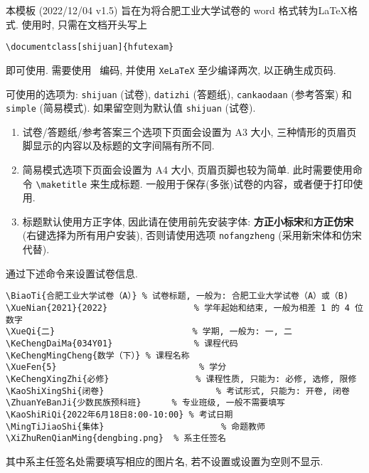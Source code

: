 \documentclass{hfutexam}
\begin{document}
\XiZhuRenQianMing{}



\indent
本模板 (2022/12/04 v1.5) 旨在为将合肥工业大学试卷的 word 格式转为\LaTeX{}格式.
使用时, 只需在文档开头写上
\begin{lstlisting}
\documentclass[shijuan]{hfutexam}
\end{lstlisting}
即可使用.
需要使用~{\color{blue}{\lstinline|UTF-8|}} 编码, 并使用 \lstinline|XeLaTeX| 至少编译两次, 以正确生成页码.

\indent
可使用的选项为: \lstinline|shijuan| (试卷), \lstinline|datizhi| (答题纸), \lstinline|cankaodaan| (参考答案) 和 \lstinline|simple| (简易模式). 如果留空则为默认值 \lstinline|shijuan| (试卷).
\begin{enumerate}
\item 试卷/答题纸/参考答案三个选项下页面会设置为 A3 大小, 三种情形的页眉页脚显示的内容以及标题的文字间隔有所不同.
\item 简易模式选项下页面会设置为 A4 大小, 页眉页脚也较为简单. 此时需要使用命令 \lstinline|\maketitle| 来生成标题.
一般用于保存(多张)试卷的内容，或者便于打印使用.
\item 标题默认使用方正字体, 因此请在使用前先安装字体: {\bfseries\titlesongti 方正小标宋}和{\bfseries\titlefangsong 方正仿宋}(右键选择为所有用户安装), 否则请使用选项 \lstinline|nofangzheng| (采用新宋体和仿宋代替).
\end{enumerate}


\indent
通过下述命令来设置试卷信息.

\textit{\color{blue}{试卷信息示例:}}
\begin{lstlisting}
\BiaoTi{合肥工业大学试卷（A）} % 试卷标题, 一般为: 合肥工业大学试卷（A）或（B)
\XueNian{2021}{2022}                 % 学年起始和结束, 一般为相差 1 的 4 位数字
\XueQi{二}                           % 学期, 一般为: 一, 二
\KeChengDaiMa{034Y01}                % 课程代码
\KeChengMingCheng{数学（下）} % 课程名称
\XueFen{5}                            % 学分
\KeChengXingZhi{必修}	             	% 课程性质, 只能为: 必修, 选修, 限修
\KaoShiXingShi{闭卷}	                 	% 考试形式, 只能为: 开卷, 闭卷
\ZhuanYeBanJi{少数民族预科班} 		% 专业班级, 一般不需要填写
\KaoShiRiQi{2022年6月18日8:00-10:00} % 考试日期
\MingTiJiaoShi{集体}                       % 命题教师
\XiZhuRenQianMing{dengbing.png}  % 系主任签名
\end{lstlisting}
其中系主任签名处需要填写相应的图片名, 若不设置或设置为空则不显示.
\end{document}
